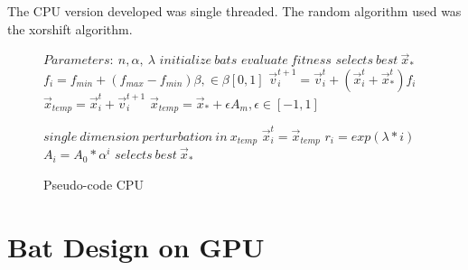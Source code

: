 \documentclass[conference]{IEEEtran}
\begin{document}
The CPU version developed was single threaded. The random algorithm used
was the xorshift algorithm.

\begin{figure}
\begin{algorithmic}[1]
\State $Parameters:\ n,\alpha,\ \lambda$
\State $initialize\ bats$
\State $evaluate\ fitness$
\State $selects\ best\ \vec{x}_*$
        \State $f_i=f_{min} + (f_{max} - f_{min})\beta, \in \beta [0,1]$
        \State $\vec{v}_i^{t+1} = \vec{v}_i^{t} + (\vec{x}_i^{t} + \vec{x}_*^{t})f_i$
        \State $\vec{x}_{temp} = \vec{x}_i^{t} + \vec{v}_i^{t+1}$
            \State $\vec{x}_{temp} = \vec{x}_* + \epsilon A_m, \epsilon \in [-1, 1]$
        \EndIf

        \State $single\ dimension\ perturbation\ in\ x_{temp}$
            \State $\vec{x}_i^t = \vec{x}_{temp}$
            \State $r_i = exp(\lambda * i)$
            \State $A_i =  A_{0} * \alpha^i$
        \EndIf
        \State $selects\ best\ \vec{x}_*$
    \EndFor
\EndWhile
\end{algorithmic}
\caption{Pseudo-code CPU}\label{GPU}
\end{figure}


\section{Bat Design on GPU}
\end{document}
